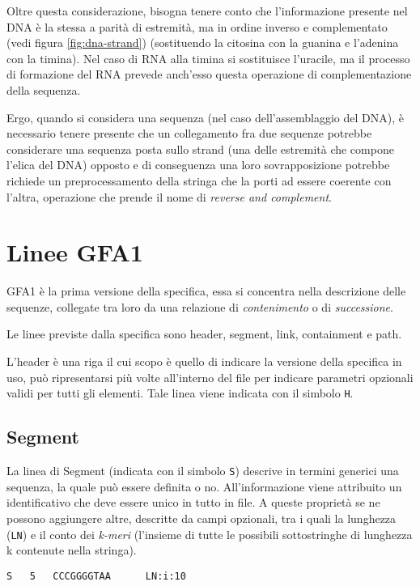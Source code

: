 Oltre questa considerazione, bisogna tenere conto che
l'informazione presente nel DNA
è la stessa a parità di estremità, ma in ordine inverso e
complementato (vedi figura \ref{fig:dna-strand}) (sostituendo
la citosina con la guanina e
l'adenina con la timina). Nel caso di RNA alla timina
si sostituisce l'uracile, ma il processo di formazione del RNA
prevede anch'esso questa operazione di complementazione
della sequenza.

Ergo, quando si considera una sequenza (nel caso
dell'assemblaggio del DNA), è necessario tenere presente
che un collegamento fra due sequenze potrebbe considerare
una sequenza posta sullo strand (una delle estremità
che compone l'elica del DNA) opposto e di conseguenza una loro
sovrapposizione potrebbe richiede un preprocessamento della
stringa che la porti ad essere coerente con l'altra, operazione
che prende il nome di \emph{reverse and complement}.

\section{Linee GFA1}
GFA1 è la prima versione della specifica, essa si concentra nella descrizione
delle sequenze, collegate tra loro da una relazione di \emph{contenimento}
o di \emph{successione}.

Le linee previste dalla specifica sono header, segment, link, containment
e path.

L'header è una riga il cui scopo è quello di indicare la versione della specifica
in uso, può ripresentarsi più volte all'interno del file per indicare parametri
opzionali validi per tutti gli elementi. Tale linea viene indicata con il simbolo \texttt{H}.

\subsection{Segment}
La linea di Segment (indicata con il simbolo \texttt{S}) descrive in termini
generici una sequenza, la quale può essere definita o no. All'informazione
viene attribuito un identificativo che deve essere unico in tutto in file.
A queste proprietà se ne possono aggiungere altre, descritte da campi
opzionali, tra i quali la lunghezza (\texttt{LN}) e
il conto dei \emph{k-meri} (l'insieme di tutte le possibili sottostringhe
di lunghezza k contenute nella stringa).

\begin{lstlisting}[basicstyle=\ttfamily, caption=Una possibile Segment line.]
S	5	CCCGGGGTAA		LN:i:10
\end{lstlisting}

